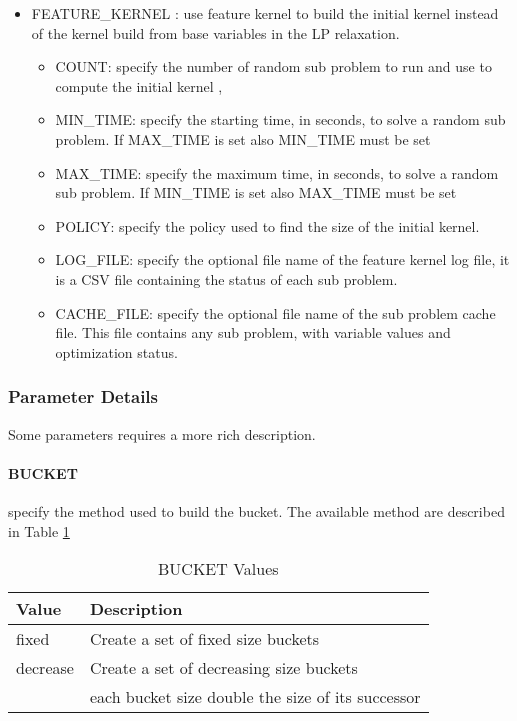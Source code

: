\begin{itemize}
            \item FEATURE\_KERNEL : use feature kernel to build the initial kernel instead of the kernel build from base variables in the LP relaxation.
            \begin{itemize}
               \item COUNT: specify the number of random sub problem to run and use to compute the initial kernel ,
               \item MIN\_TIME: specify the starting time, in seconds, to solve a random sub problem. If MAX\_TIME is set also MIN\_TIME must be set
               \item MAX\_TIME: specify the maximum time, in seconds, to solve a random sub problem. If MIN\_TIME is set also MAX\_TIME must be set
               \item POLICY: specify the policy used to find the size of the initial kernel.
               \item LOG\_FILE: specify the optional file name of the feature kernel log file, it is a CSV file containing the status of each sub problem.
               \item CACHE\_FILE: specify the optional file name of the sub problem cache file. This file contains any sub problem, with variable values and 
               optimization status.
            \end{itemize}
         \end{itemize}


        
        \subsubsection{Parameter Details}
        Some parameters requires a more rich description. 
        \paragraph{BUCKET} specify the method used to build the bucket. The available method are described in Table \ref{tab:bucket}

        \begin{table}[ht]
            \centering
           \caption{BUCKET Values}
           \begin{tabular}{|l|l|}
               \hline 
               Value & Description \\
               \hline
               \hline
               fixed & Create a set of fixed size buckets\\
               \hline
               decrease & Create a set of decreasing size buckets\\
               &  each bucket size double the size of its successor\\
               \hline
           \end{tabular}
           \label{tab:bucket}
        \end{table}

